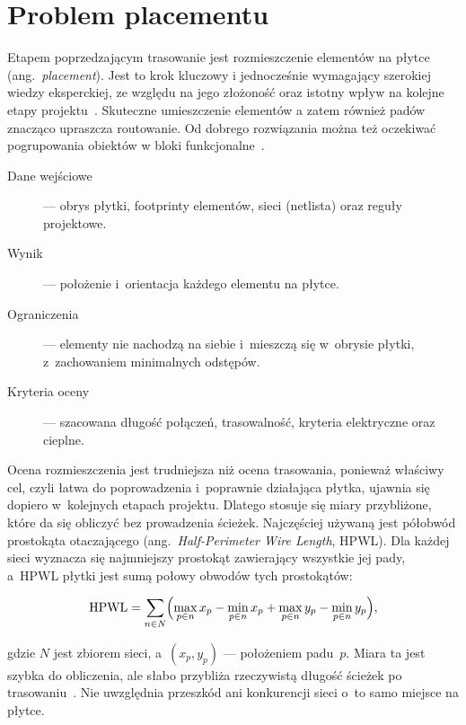 \section{Problem placementu}
\label{sec:problem-placementu}

Etapem poprzedzającym trasowanie jest rozmieszczenie elementów na płytce (ang.~\emph{placement}). 
Jest to krok kluczowy i jednocześnie wymagający szerokiej wiedzy eksperckiej, ze względu na jego 
złożoność oraz istotny wpływ na kolejne etapy projektu~\cite{Cheng2021DeepPR}. Skuteczne umieszczenie elementów a zatem również 
padów znacząco upraszcza routowanie. Od dobrego rozwiązania można też oczekiwać pogrupowania obiektów
w bloki funkcjonalne~\cite{Gora_ProjektowaniePCB}.

\begin{description}
  \item[Dane wejściowe] --- obrys płytki, footprinty elementów, sieci
    (netlista) oraz reguły projektowe.
  \item[Wynik] --- położenie i~orientacja każdego elementu na płytce.
  \item[Ograniczenia] --- elementy nie nachodzą na siebie i~mieszczą się
    w~obrysie płytki, z~zachowaniem minimalnych odstępów.
  \item[Kryteria oceny] --- szacowana długość połączeń, trasowalność,
    kryteria elektryczne oraz cieplne.
\end{description}

Ocena rozmieszczenia jest trudniejsza niż ocena trasowania, ponieważ
właściwy cel, czyli łatwa do poprowadzenia i~poprawnie działająca płytka,
ujawnia się dopiero w~kolejnych etapach projektu. Dlatego stosuje się miary
przybliżone, które da się obliczyć bez prowadzenia ścieżek. Najczęściej
używaną jest półobwód prostokąta otaczającego (ang.~\emph{Half-Perimeter
Wire Length}, HPWL). Dla każdej sieci wyznacza się najmniejszy prostokąt
zawierający wszystkie jej pady, a~HPWL płytki jest sumą połowy obwodów tych
prostokątów:

\begin{equation}
  \mathrm{HPWL} = \sum_{n \in N}
  \Bigl( \max_{p \in n} x_p - \min_{p \in n} x_p
       + \max_{p \in n} y_p - \min_{p \in n} y_p \Bigr),
  \label{eq:hpwl}
\end{equation}

gdzie $N$ jest zbiorem sieci, a~$(x_p, y_p)$ --- położeniem padu~$p$. 
Miara ta jest szybka do obliczenia, ale słabo przybliża
rzeczywistą długość ścieżek po trasowaniu~\cite{Cheng2021DeepPR}. Nie
uwzględnia przeszkód ani konkurencji sieci o~to samo miejsce na płytce.

